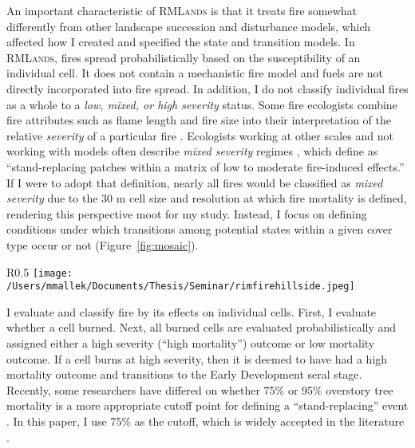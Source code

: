 An important characteristic of \textsc{RMLands} is that it treats fire somewhat differently from other landscape succession and disturbance models, which affected how I created and specified the state and transition models. In \textsc{RMLands}, fires spread probabilistically based on the susceptibility of an individual cell. It does not contain a mechanistic fire model and fuels are not directly incorporated into fire spread. In addition, I do not classify individual fires as a whole to a \emph{low, mixed, or high severity} status. Some fire ecologists combine fire attributes such as flame length and fire size into their interpretation of the relative \emph{severity} of a particular fire \citep{Agee1993}.   Ecologists working at other scales and not working with models often describe \emph{mixed severity} regimes \citep[e.g.,][]{Kane2013}, which \citet{Collins2010} define as ``stand-replacing patches within a matrix of low to moderate fire-induced effects.'' If I were to adopt that definition, nearly all fires would be classified as \emph{mixed severity} due to the 30 m cell size and resolution at which fire mortality is defined, rendering this perspective moot for my study. Instead, I focus on defining conditions under which transitions among potential states within a given cover type occur or not (Figure~\ref{fig:mosaic}).
\begin{wrapfigure}{R}{0.5\textwidth} %
\texttt{[image: /Users/mmallek/Documents/Thesis/Seminar/rimfirehillside.jpeg]}
\caption{Aftermath of the 2013 Rim Fire in the Sierra Nevada. As in my model, post-fire, the landscape can be sorted into high mortality and low mortality areas. Photo from USFS Region 5.} 
\label{fig:mosaic}
\end{wrapfigure} 
I evaluate and classify fire by its effects on individual cells. First, I evaluate whether a cell burned. Next, all burned cells are evaluated probabilistically and assigned either a high severity (``high mortality'') outcome or low mortality outcome. If a cell burns at high severity, then it is deemed to have had a high mortality outcome and transitions to the Early Development seral stage. Recently, some researchers have differed on whether 75\% or 95\% overstory tree mortality is a more appropriate cutoff point for defining a ``stand-replacing'' event \citep{Fule2014,Mallek2013}. In this paper, I use 75\% as the cutoff, which is widely accepted in the literature \citep{Agee1993,Agee2007,Miller2009,Baker2014}.

